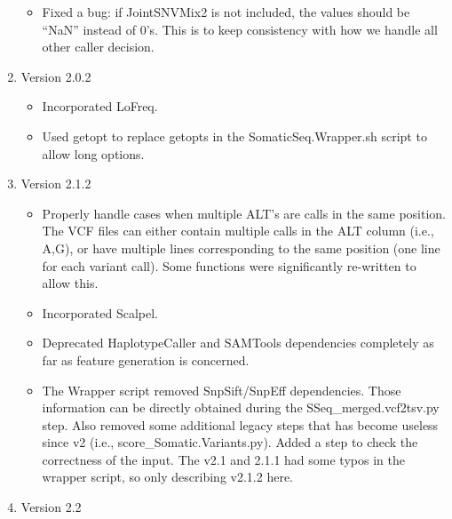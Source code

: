\documentclass[10pt,letterpaper]{article}
\begin{document}
\begin{sloppypar}
\begin{enumerate}
\begin{itemize}
		  \item
		  Fixed a bug: if JointSNVMix2 is not included, the values should be ``NaN'' instead of 0's. This is to keep consistency with how we handle all other caller decision.
		\end{itemize}
	
	
	
	\item Version 2.0.2
	
		\begin{itemize}
		
		  \item
		  Incorporated LoFreq.
		  
		  \item
		  Used getopt to replace getopts in the SomaticSeq.Wrapper.sh script to allow long options. 
		  
		\end{itemize}
	
	
	
	\item Version 2.1.2
	
	\begin{itemize}
	
	  \item
	  Properly handle cases when multiple ALT's are calls in the same position. The VCF files can either contain multiple calls in the ALT column (i.e., A,G), or have multiple lines corresponding to the same position (one line for each variant call). Some functions were significantly re-written to allow this.
	
	  \item
	  Incorporated Scalpel.
	  
	  \item
	  Deprecated HaplotypeCaller and SAMTools dependencies completely as far as feature generation is concerned.
	  
	  \item
	  The Wrapper script removed SnpSift/SnpEff dependencies. Those information can be directly obtained during the SSeq\_merged.vcf2tsv.py step. Also removed some additional legacy steps that has become useless since v2 (i.e., score\_Somatic.Variants.py). Added a step to check the correctness of the input. The v2.1 and 2.1.1 had some typos in the wrapper script, so only describing v2.1.2 here.
	
	\end{itemize}
	
	
	
	\item Version 2.2
	

\end{enumerate}
\end{sloppypar}
\end{document}
